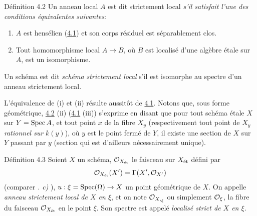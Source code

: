 \documentclass[10pt]{../fichiers-configuration-latex/smfart}
\begin{document}
\begin{enonce*}{Définition 4.2}
Un anneau local $A$ est dit strictement local \emph{s'il satisfait
  l'une des conditions équivalentes suivantes}:
\begin{enumerate}
\renewcommand{\theenumi}{\roman{enumi}}
\renewcommand{\labelenumi}{(\theenumi)}
\item $A$ est hensélien (\hyperref[VIII.subsec4.1]{4.1})
et son corps résiduel est séparablement clos.

\item Tout homomorphisme local $A \to B$, où $B$ est localisé d'une
  algèbre étale sur $A$, est un isomorphisme.
\end{enumerate}

Un schéma est dit \emph{schéma strictement local} s'il est isomorphe au
spectre d'un anneau strictement local.
\end{enonce*}

L'équivalence de (i) et (ii) résulte aussitôt de \hyperref[VIII.subsec4.1]{4.1}.
Notons que, sous
forme géométrique, \hyperref[VIII.def4.2]{4.2} (ii) (\resp \hyperref[VIII.subsec4.1]{4.1} (iii))
s'exprime en disant que
pour tout schéma étale $X$ sur $Y = \operatorname{Spec} A$, et tout point $x$ de la
fibre $X_y$ (respectivement tout point de $X_y$ \emph{rationnel sur}
$k(y)$), où $y$ est le point fermé de $Y$, il existe une section de $X$
sur $Y$ passant par $y$ (section qui est d'ailleurs nécessairement
unique).

\begin{enonce*}{Définition 4.3}
Soient $X$ un schéma, ${\mathcal O}_{X_{\text{\rm ét}}}$ le faisceau sur
$X_{\text{\rm ét}}$ défini
par
$$
{\mathcal O}_{X_{\text{\rm ét}}} (X') = \Gamma (X', {\mathcal O}_{X'})
$$
(comparer \emph{. c)} ), $u : \xi = \Spec (\Omega) \to X$ un point
géométrique de $X$. On appelle \emph{anneau strictement local de $X$ en
$\xi$}, et on note ${\mathcal O}_{{X,}_{\xi}}$ ou simplement\pageoriginale
${\mathcal O}_{\xi}$, la fibre du faisceau ${\mathcal O}_{X_{\text{\rm ét}}}$ en le
point $\xi$. Son spectre est
appelé \emph{localisé strict de $X$ en $\xi$}.
\end{enonce*}
\end{document}
